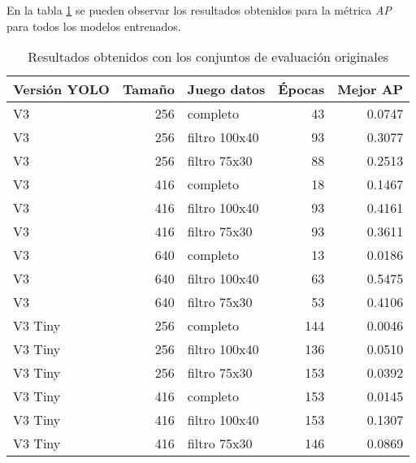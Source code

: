 En la tabla \ref{tab:evaluationoriginal} se pueden observar los resultados obtenidos para la métrica \textit{AP} para todos los modelos entrenados.

\begin{table}[H]
	\centering
	\begin{tabular}{lrlrr}
		\toprule
		Versión YOLO &  Tamaño &    Juego datos &  Épocas &  Mejor AP \\
		\midrule
		V3      &     256 &       completo &      43 &    0.0747 \\
		V3      &     256 &  filtro 100x40 &      93 &    0.3077 \\
		V3      &     256 &   filtro 75x30 &      88 &    0.2513 \\
		V3      &     416 &       completo &      18 &    0.1467 \\
		V3      &     416 &  filtro 100x40 &      93 &    0.4161 \\
		V3      &     416 &   filtro 75x30 &      93 &    0.3611 \\
		V3      &     640 &       completo &      13 &    0.0186 \\
		V3      &     640 &  filtro 100x40 &      63 &    0.5475 \\
		V3      &     640 &   filtro 75x30 &      53 &    0.4106 \\
		V3 Tiny &     256 &       completo &     144 &    0.0046 \\
		V3 Tiny &     256 &  filtro 100x40 &     136 &    0.0510 \\
		V3 Tiny &     256 &   filtro 75x30 &     153 &    0.0392 \\
		V3 Tiny &     416 &       completo &     153 &    0.0145 \\
		V3 Tiny &     416 &  filtro 100x40 &     153 &    0.1307 \\
		V3 Tiny &     416 &   filtro 75x30 &     146 &    0.0869 \\
		\bottomrule
	\end{tabular}
	\caption{Resultados obtenidos con los conjuntos de evaluación originales}
	\label{tab:evaluationoriginal}
\end{table}


